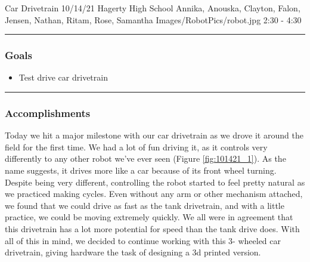 \insertmeeting 
  {Car Drivetrain} 
  {10/14/21}
  {Hagerty High School}
  {Annika, Anouska, Clayton, Falon, Jensen, Nathan, Ritam, Rose, Samantha}
  {Images/RobotPics/robot.jpg}
  {2:30 - 4:30}
  
\noindent\hfil\rule{\textwidth}{.4pt}\hfil
\subsubsection*{Goals}
\begin{itemize}
    \item Test drive car drivetrain  

\end{itemize} 

\noindent\hfil\rule{\textwidth}{.4pt}\hfil

\subsubsection*{Accomplishments}
Today we hit a major milestone with our car drivetrain as we drove it around the field for the first time. We had a lot of fun driving it, as it controls very differently to any other robot we’ve ever seen (Figure \ref{fig:101421_1}). As the name suggests, it drives more like a car because of its front wheel turning. Despite being very different, controlling the robot started to feel pretty natural as we practiced making cycles. Even without any arm or other mechanism attached, we found that we could drive as fast as the tank drivetrain, and with a little practice, we could be moving extremely quickly. We all were in agreement that this drivetrain has a lot more potential for speed than the tank drive does. With all of this in mind, we decided to continue working with this 3- wheeled car drivetrain, giving hardware the task of designing a 3d printed version.


